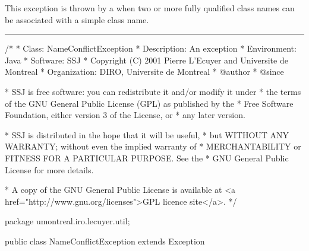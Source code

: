 
This exception is thrown by a 
when two or more fully qualified class names can be
associated with a simple class name.

\bigskip\hrule
\begin{code}\begin{hide}
/*
 * Class:        NameConflictException
 * Description:  An exception 
 * Environment:  Java
 * Software:     SSJ 
 * Copyright (C) 2001  Pierre L'Ecuyer and Universite de Montreal
 * Organization: DIRO, Universite de Montreal
 * @author       
 * @since

 * SSJ is free software: you can redistribute it and/or modify it under
 * the terms of the GNU General Public License (GPL) as published by the
 * Free Software Foundation, either version 3 of the License, or
 * any later version.

 * SSJ is distributed in the hope that it will be useful,
 * but WITHOUT ANY WARRANTY; without even the implied warranty of
 * MERCHANTABILITY or FITNESS FOR A PARTICULAR PURPOSE.  See the
 * GNU General Public License for more details.

 * A copy of the GNU General Public License is available at
   <a href="http://www.gnu.org/licenses">GPL licence site</a>.
 */\end{hide}
package umontreal.iro.lecuyer.util;


public class NameConflictException extends Exception\begin{hide} {
   private static final long serialVersionUID = -5124156035520217708L;
   private ClassFinder finder;
   private String name;
\end{hide}
\end{code}

